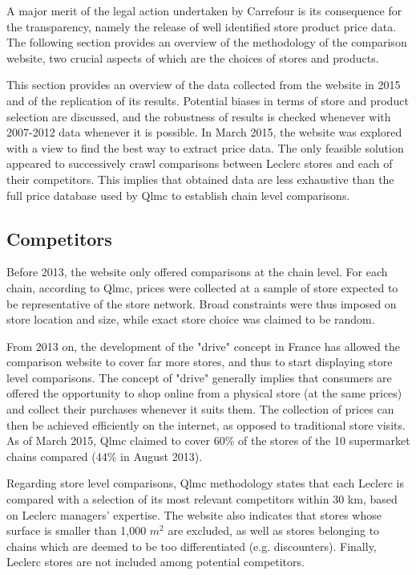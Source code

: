 \documentclass[english]{article}
\begin{document}
A major merit of the legal action undertaken by Carrefour is its consequence for the transparency, namely the release of well identified store product price data. The following section provides an overview of the methodology of the comparison website, two crucial aspects of which are the choices of stores and products.

This section provides an overview of the data collected from the website in 2015 and of the replication of its results. Potential biases in terms of store and product selection are discussed, and the robustness of results is checked whenever with 2007-2012 data whenever it is possible. In March 2015, the website was explored with a view to find the best way to extract price data. The only feasible solution appeared to successively crawl comparisons between Leclerc stores and each of their competitors. This implies that obtained data are less exhaustive than the full price database used by Qlmc to establish chain level comparisons.

\subsection{Competitors}

Before 2013, the website only offered comparisons at the chain level. For each chain, according to Qlmc, prices were collected at a sample of store expected to be representative of the store network. Broad constraints were thus imposed on store location and size, while exact store choice was claimed to be random.

From 2013 on, the development of the "drive" concept in France has allowed the comparison website to cover far more stores, and thus to start displaying store level comparisons. The concept of "drive" generally implies that consumers are offered the opportunity to shop online from a physical store (at the same prices) and collect their purchases whenever it suits them. The collection of prices can then be achieved efficiently on the internet, as opposed to traditional store visits. As of March 2015, Qlmc claimed to cover 60\% of the stores of the 10 supermarket chains compared (44\% in August 2013).

Regarding store level comparisons, Qlmc  methodology states that each Leclerc is compared with a selection of its most relevant competitors within 30 km, based on Leclerc managers' expertise. The website also indicates that stores whose surface is smaller than 1,000 $m^2$ are excluded, as well as stores belonging to chains which are deemed to be too differentiated (e.g. discounters). Finally, Leclerc stores are not included among potential competitors.
\end{document}
